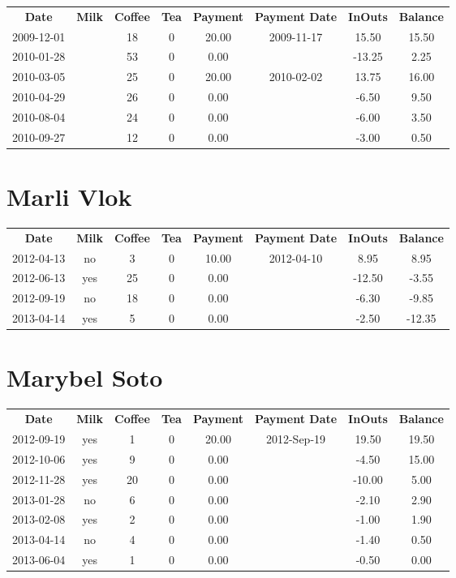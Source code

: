 \begin{center}
\begin{tabular}{cccccccc}
\textbf{Date} & \textbf{Milk} & \textbf{Coffee} & \textbf{Tea} & \textbf{Payment} & \textbf{Payment Date} & \textbf{InOuts} & \textbf{Balance} \\
2009-12-01 &  & 18 & 0 & 20.00 & 2009-11-17 &  15.50 & 15.50\\ 
2010-01-28 &  & 53 & 0 &  0.00 &  & -13.25 &  2.25\\ 
2010-03-05 &  & 25 & 0 & 20.00 & 2010-02-02 &  13.75 & 16.00\\ 
2010-04-29 &  & 26 & 0 &  0.00 &  &  -6.50 &  9.50\\ 
2010-08-04 &  & 24 & 0 &  0.00 &  &  -6.00 &  3.50\\ 
2010-09-27 &  & 12 & 0 &  0.00 &  &  -3.00 &  0.50
\end{tabular}
\end{center}

\section{Marli Vlok}

\begin{center}
\begin{tabular}{cccccccc}
\textbf{Date} & \textbf{Milk} & \textbf{Coffee} & \textbf{Tea} & \textbf{Payment} & \textbf{Payment Date} & \textbf{InOuts} & \textbf{Balance} \\
2012-04-13 & no &  3 & 0 & 10.00 & 2012-04-10 &   8.95 &   8.95\\ 
2012-06-13 & yes & 25 & 0 &  0.00 &  & -12.50 &  -3.55\\ 
2012-09-19 & no & 18 & 0 &  0.00 &  &  -6.30 &  -9.85\\ 
2013-04-14 & yes &  5 & 0 &  0.00 &  &  -2.50 & -12.35
\end{tabular}
\end{center}

\section{Marybel Soto}

\begin{center}
\begin{tabular}{cccccccc}
\textbf{Date} & \textbf{Milk} & \textbf{Coffee} & \textbf{Tea} & \textbf{Payment} & \textbf{Payment Date} & \textbf{InOuts} & \textbf{Balance} \\
2012-09-19 & yes &  1 & 0 & 20.00 & 2012-Sep-19 &  19.50 & 19.50\\ 
2012-10-06 & yes &  9 & 0 &  0.00 &  &  -4.50 & 15.00\\ 
2012-11-28 & yes & 20 & 0 &  0.00 &  & -10.00 &  5.00\\ 
2013-01-28 & no &  6 & 0 &  0.00 &  &  -2.10 &  2.90\\ 
2013-02-08 & yes &  2 & 0 &  0.00 &  &  -1.00 &  1.90\\ 
2013-04-14 & no &  4 & 0 &  0.00 &  &  -1.40 &  0.50\\ 
2013-06-04 & yes &  1 & 0 &  0.00 &  &  -0.50 &  0.00
\end{tabular}
\end{center}

